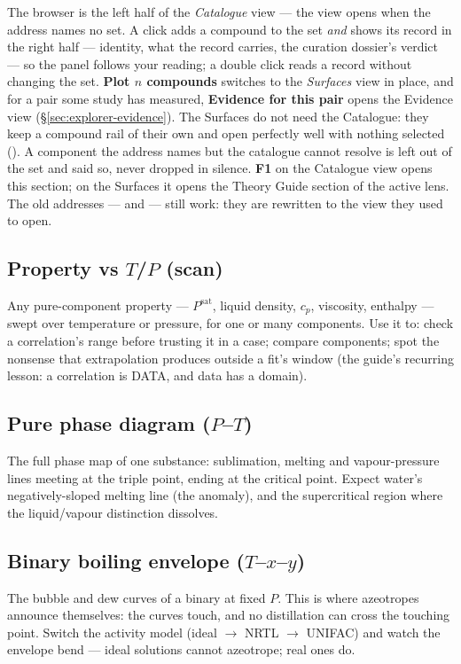 \documentclass[11pt,a4paper]{article}
\begin{document}
The browser is the left half of the \emph{Catalogue} view --- the view
 opens when the address names no set.  A click adds
a compound to the set \emph{and} shows its record in the right half ---
identity, what the record carries, the curation dossier's verdict --- so the
panel follows your reading; a double click reads a record without changing
the set.  \textbf{Plot $n$ compounds} switches to the \emph{Surfaces} view
in place, and for a pair some study has measured, \textbf{Evidence for this
pair} opens the Evidence view (\S\ref{sec:explorer-evidence}).  The
Surfaces do not need the Catalogue: they keep a compound rail of their own
and open perfectly well with nothing selected
().  A component the address names
but the catalogue cannot resolve is left out of the set and said so, never
dropped in silence.  \textbf{F1} on the Catalogue view opens this section; on
the Surfaces it opens the Theory Guide section of the active lens.  The old
addresses ---  and 
--- still work: they are rewritten to the view they used to open.

\subsection{Property vs $T$/$P$ (scan)}
Any pure-component property --- $P^{\mathrm{sat}}$, liquid density,
$c_p$, viscosity, enthalpy --- swept over temperature or pressure, for one
or many components.  Use it to: check a correlation's range before trusting
it in a case; compare components; spot the nonsense that extrapolation
produces outside a fit's window (the guide's recurring lesson: a
correlation is DATA, and data has a domain).

\subsection{Pure phase diagram ($P$--$T$)}
The full phase map of one substance: sublimation, melting and vapour-pressure
lines meeting at the triple point, ending at the critical point.  Expect
water's negatively-sloped melting line (the anomaly), and the supercritical
region where the liquid/vapour distinction dissolves.

\subsection{Binary boiling envelope ($T$--$x$--$y$)}
The bubble and dew curves of a binary at fixed $P$.  This is where
azeotropes announce themselves: the curves touch, and no distillation can
cross the touching point.  Switch the activity model (ideal $\to$ NRTL
$\to$ UNIFAC) and watch the envelope bend --- ideal solutions cannot
azeotrope; real ones do.
\end{document}
